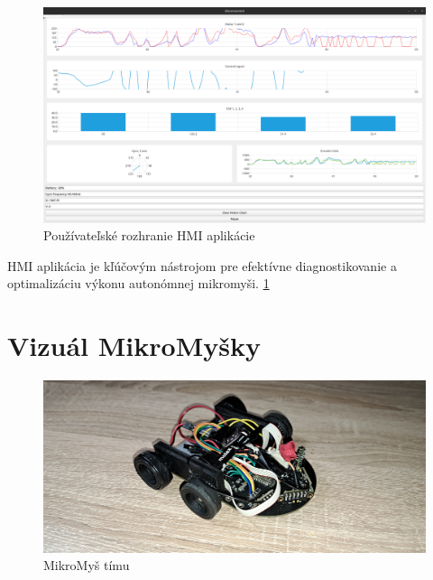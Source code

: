 \begin{figure}[!htpb]
    \centering
    \includegraphics[width=14cm]{includes//images/image.png}
    \caption{Používateľské rozhranie HMI aplikácie }
    \label{fig:UDP}
\end{figure}
HMI aplikácia je kľúčovým nástrojom pre efektívne diagnostikovanie a optimalizáciu výkonu autonómnej mikromyši. \ref{fig:UDP} 
\section{Vizuál MikroMyšky}
\begin{figure}[!htpb]
    \centering
    \includegraphics[width=14cm]{includes/images/potkan.jpg}
    \caption{MikroMyš tímu}
    \label{fig:Potkan}
\end{figure}